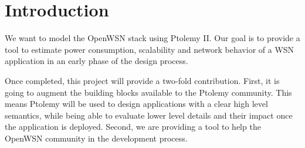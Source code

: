 \section{Introduction}
We want to model the OpenWSN stack using Ptolemy II. Our goal is to provide a tool to estimate power consumption, scalability and network behavior of a WSN application in an early phase of the design process.

Once completed, this project will provide a two-fold contribution. First, it is going to augment the building blocks available to the Ptolemy community. This means Ptolemy will be used to design applications with a clear high level semantics, while being able to evaluate lower level details and their impact once the application is deployed. Second, we are providing a tool to help the OpenWSN community in the development process.

